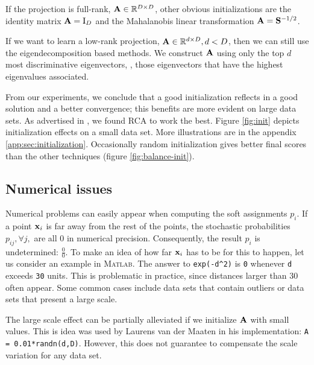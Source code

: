        If the projection is full-rank, $\mathbf{A}\in\mathbb{R}^{D\times D}$, other obvious initializations are the identity matrix $\mathbf{A}=\mathrm{I}_D$ and the Mahalanobis linear transformation $\mathbf{A}=\mathbf{S}^{-1/2}$.

	If we want to learn a low-rank projection, $\mathbf{A} \in \mathbb{R}^{d\times D},d<D$, then we can still use the eigendecomposition based methods. We construct $\mathbf{A}$ using only the top $d$ most
        discriminative eigenvectors, \ie, those eigenvectors that have the
        highest eigenvalues associated.

        From our experiments, we conclude that a good
        initialization reflects in a good solution and a better convergence; this benefits are more evident on
        large data sets. As advertised in \citep{butman2008}, we found RCA to work the best. Figure \ref{fig:init} depicts initialization effects on a small data set. More illustrations are in the appendix \ref{app:sec:initialization}. Occasionally random initialization gives better final scores than the other techniques (figure \ref{fig:balance-init}). 

\subsection{Numerical issues}
\label{subsec:numerical-issues}

	Numerical problems can easily appear when computing the soft assignments $p_i$. If a point
        $\mathbf{x}_i$ is far away from the rest of the points, the stochastic probabilities $p_{ij}, \forall j,$ are all 0 in numerical precision. Consequently, the result $p_i$ is undetermined: $\frac{0}{0}$. 
	To make an idea of how far $\mathbf{x}_i$ has to be for this to happen, let us consider an example in \textsc{Matlab}. The answer to 
        \texttt{exp(-d\^{}2)} is \texttt{0} whenever \texttt{d} exceeds \texttt{30} units.
	This is problematic in practice, since distances larger than 30 often appear. Some common cases include data sets that contain outliers or data sets that present a large scale. 

	The large scale effect can be partially alleviated if we initialize $\mathbf{A}$ with small values. This is idea was used by Laurens van der Maaten in his implementation: \texttt{A = 0.01*randn(d,D)}. However, this does not guarantee to compensate the scale variation for any data set.


